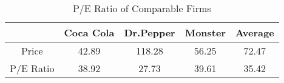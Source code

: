 \begin{table}[ht]
\centering
\begin{tabular}{@{}ccccc@{}}
\toprule
           & Coca Cola & Dr.Pepper & Monster & Average \\ \midrule
Price      & 42.89     & 118.28    & 56.25   & 72.47   \\
P/E Ratio  & 38.92     & 27.73     & 39.61   & 35.42   \\ \bottomrule
\end{tabular}
\caption{P/E Ratio of Comparable Firms}
\label{tab:part2-p/e ratio}
\end{table}
